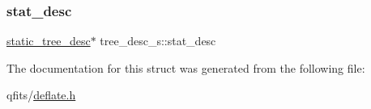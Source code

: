 \mbox{\label{structtree__desc__s_a7f237428776ee85058bb7f7f11900dd2}} 
\subsubsection{\texorpdfstring{stat\+\_\+desc}{stat\_desc}}
{\footnotesize\ttfamily \hyperlink{deflate_8h_a905910aabf6aabbe79ff0832e4a664cc}{static\+\_\+tree\+\_\+desc}$\ast$ tree\+\_\+desc\+\_\+s\+::stat\+\_\+desc}



The documentation for this struct was generated from the following file\+:\begin{DoxyCompactItemize}
\item 
qfits/\hyperlink{deflate_8h}{deflate.\+h}\end{DoxyCompactItemize}
